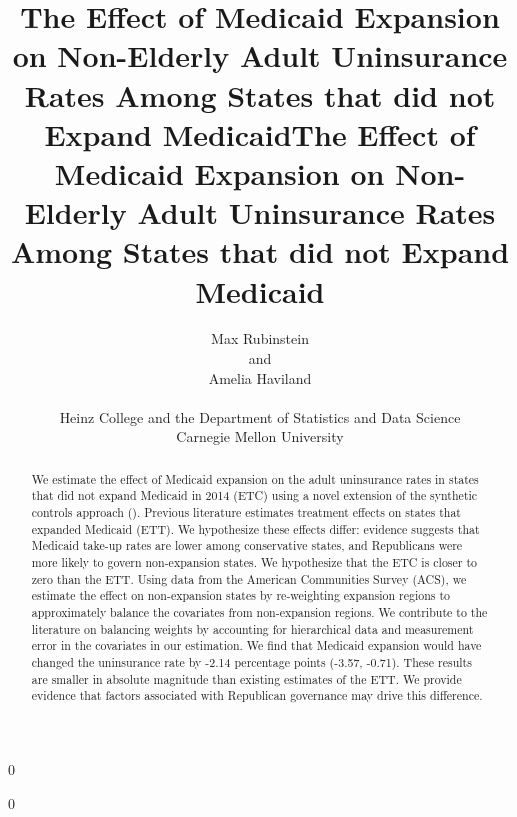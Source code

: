 \documentclass[12pt]{article}
\newcommand{\blind}{0}
\begin{document}
\blind
{
  \title{\bf The Effect of Medicaid Expansion on Non-Elderly Adult Uninsurance Rates Among States that did not Expand Medicaid}
  \author{Max Rubinstein \hspace{.2cm}\\
    and \\
    Amelia Haviland \\ \\
    Heinz College and the Department of Statistics and Data Science \\ Carnegie Mellon University}
  \maketitle
} \fi

\blind
{
  \bigskip
  \bigskip
  \bigskip
  \begin{center}
  \title{\bf The Effect of Medicaid Expansion on Non-Elderly Adult Uninsurance Rates Among States that did not Expand Medicaid}
\end{center}
  \medskip
} \fi

\bigskip

\begin{abstract}

We estimate the effect of Medicaid expansion on the adult uninsurance rates in states that did not expand Medicaid in 2014 (ETC) using a novel extension of the synthetic controls approach (\cite{abadie2010synthetic}). Previous literature estimates treatment effects on states that expanded Medicaid (ETT). We hypothesize these effects differ: evidence suggests that Medicaid take-up rates are lower among conservative states, and Republicans were more likely to govern non-expansion states. We hypothesize that the ETC is closer to zero than the ETT. Using data from the American Communities Survey (ACS), we estimate the effect on non-expansion states by re-weighting expansion regions to approximately balance the covariates from non-expansion regions. We contribute to the literature on balancing weights by accounting for hierarchical data and measurement error in the covariates in our estimation. We find that Medicaid expansion would have changed the uninsurance rate by -2.14 percentage points (-3.57, -0.71). These results are smaller in absolute magnitude than existing estimates of the ETT. We provide evidence that factors associated with Republican governance may drive this difference.

\end{abstract}
\end{document}
